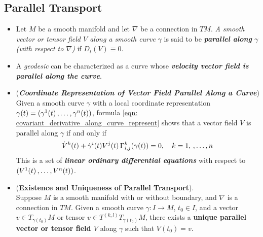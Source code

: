 \documentclass[11pt]{article}
\begin{document}
\subsection{Parallel Transport}
\begin{itemize}
\item \begin{definition}
Let $M$ be a smooth manifold and let $\nabla$ be a connection in $TM$. \emph{A smooth vector or tensor field $V$ along a smooth curve} $\gamma$ is said to be \emph{\textbf{parallel along} $\gamma$ (with respect to $\nabla$)} if $D_t(V) \equiv 0$.
\end{definition}

\item \begin{remark}
A \emph{geodesic} can be characterized as a curve whose \emph{\textbf{velocity vector field is parallel along the curve}}.
\end{remark}

\item \begin{remark} (\emph{\textbf{Coordinate Representation of Vector Field Parallel Along a Curve}})\\
Given a smooth curve $\gamma$ with a local coordinate representation $\gamma(t) = (\gamma^1(t) \,{,}\ldots{,}\, \gamma^n(t))$, formula \eqref{eqn: covariant_derivative_along_curve_represent} shows that a vector field $V$ is parallel along $\gamma$ if and only if
\begin{align}
\dot{V}^k(t)  + \dot{\gamma}^{i}(t)V^j(t)\,\Gamma_{i,j}^{k}(\gamma(t)) = 0, \quad k=1,\,{,}\ldots{,}\, n \label{eqn: vector_field_parallel_along_curve_represent}
\end{align} This is a set of \emph{\textbf{linear ordinary differential equations}} with respect to $(V^1(t) \,{,}\ldots{,}\, V^n(t))$.
\end{remark}

\item \begin{theorem} (\textbf{Existence and Uniqueness of Parallel Transport}). \\
Suppose $M$ is a smooth manifold with or without boundary, and $\nabla$ is a connection in $TM$. Given a smooth curve $\gamma: I \rightarrow M$, $t_0 \in I$, and a vector $v \in T_{\gamma(t_0)}M$ or tensor $v \in T^{(k,l)}T_{\gamma(t_0)}M$, there exists a \textbf{unique parallel vector or tensor field $V$} along $\gamma$ such that $V(t_0) = v$.
\end{theorem}


\end{itemize}
\end{document}

